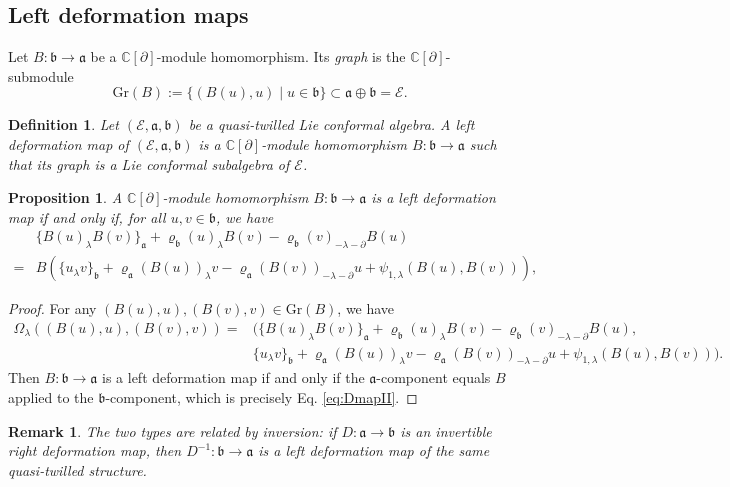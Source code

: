 \documentclass[a4paper,11pt]{article}
\def\Rg{\mathbb{C}[\partial]}
\def\Ep{\mathcal{E}}
\def\Vs{\mathfrak{a}}
\def\Ws{\mathfrak{b}}
\def\rep{\varrho}
\def\la{\lambda}
\def\p{\partial}
\numberwithin{equation}{section}
\newtheorem{definition}[theorem]{Definition}
\newtheorem{proposition}[theorem]{Proposition}
\newtheorem{remark}[theorem]{Remark}
\begin{document}
\subsection{Left deformation maps}
\label{subsec:DmapII}
 
Let $B:\Ws\to\Vs$ be a $\Rg$-module homomorphism.  Its \textit{graph} is the $\Rg$-submodule
\[
  \mathrm{Gr}(B) := \{(B(u),u)\mid u\in\Ws\} \subset \Vs\oplus\Ws = \Ep.
\]
 
\begin{definition}\label{def:DmapII}
Let $(\Ep,\Vs,\Ws)$ be a quasi-twilled  Lie conformal algebra.
A left deformation map  of $(\Ep,\Vs,\Ws)$
is a $\Rg$-module homomorphism $B:\Ws\longrightarrow\Vs$
such that its graph is a Lie conformal subalgebra of $\Ep$. 
\end{definition}

\begin{proposition}\label{left Dmap identity}
A $\Rg$-module homomorphism $B:\Ws\to\Vs$ is a left deformation map  if and only if, for all $u,v\in\Ws$, we have
\begin{align}
  & \{B(u)_\la B(v)\}_\Vs
  + \rep_\Ws(u)_\la B(v) - \rep_\Ws(v)_{-\la-\p}B(u) \nonumber\\
  =&  B(\{u_\la v\}_\Ws + \rep_\Vs(B(u))_\la v
             - \rep_\Vs(B(v))_{-\la-\p}u
             + \psi_{1,\la}(B(u),B(v))), \label{eq:DmapII}  
\end{align}
\end{proposition}

\begin{proof}
For any $(B(u),u), (B(v),v) \in \mathrm{Gr}(B)$, we have
\begin{align*}
\Omega_\la((B(u),u), (B(v),v))=&(\{B(u)_\la B(v)\}_\Vs
  + \rep_\Ws(u)_\la B(v) - \rep_\Ws(v)_{-\la-\p}B(u),\\
  & \{u_\la v\}_\Ws + \rep_\Vs(B(u))_\la v
             - \rep_\Vs(B(v))_{-\la-\p}u
             + \psi_{1,\la}(B(u),B(v))).
\end{align*}
Then $B: \Ws\to\Vs$ is a left deformation map if and only if the $\Vs$-component equals
$B$ applied to the $\Ws$-component, which is precisely Eq. \eqref{eq:DmapII}.
\end{proof}
 
\begin{remark}
  The two types are related by inversion: if
$D:\Vs\to\Ws$ is an invertible right deformation map, then $D^{-1}:\Ws\to\Vs$ is a
left deformation map of the same quasi-twilled structure.
\end{remark}
 
\end{document}
